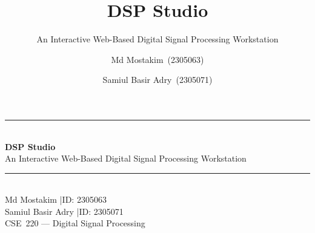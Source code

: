 \documentclass[aspectratio=169]{beamer}
\title{\textbf{DSP Studio}}
\subtitle{An Interactive Web-Based Digital Signal Processing Workstation}
\author{Md Mostakim \,(2305063) \and Samiul Basir Adry \,(2305071)}
\institute{\small CSE~220 --- Digital Signal Processing}
\date{}
\begin{document}
{
\begin{frame}[plain]
  \vspace{1.4cm}
  \centering
  {\color{goldAccent}\rule{5cm}{0.6pt}}\\[0.5em]
  {\Huge\bfseries\color{textLight} DSP Studio}\\[0.3em]
  {\large\color{textMuted} An Interactive Web-Based Digital Signal Processing Workstation}\\[1.2em]
  {\color{goldAccent}\rule{5cm}{0.6pt}}\\[1.6em]
  {\large\color{textLight} Md Mostakim \quad\textcolor{textMuted}{|}\quad ID: 2305063}\\[0.4em]
  {\large\color{textLight} Samiul Basir Adry \quad\textcolor{textMuted}{|}\quad ID: 2305071}\\[1.6em]
  {\small\color{textMuted} CSE~220 --- Digital Signal Processing}
\end{frame}
}
\end{document}
